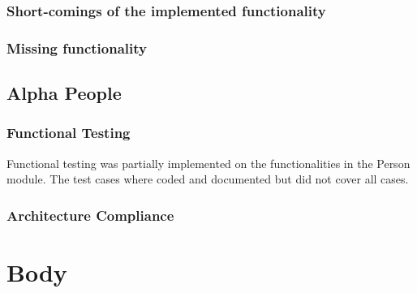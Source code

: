 \documentclass{article}
\begin{document}
        \subsubsection{Short-comings of the implemented functionality}
        \subsubsection{Missing functionality}
        
        \subsection{Alpha People}
\subsubsection{Functional Testing}
	Functional testing was partially implemented on the functionalities in the Person module. The test cases where coded and documented but did not cover all cases.

\subsubsection{Architecture Compliance}

\newpage
\section{Body}
\lipsum[1]
\end{document}
